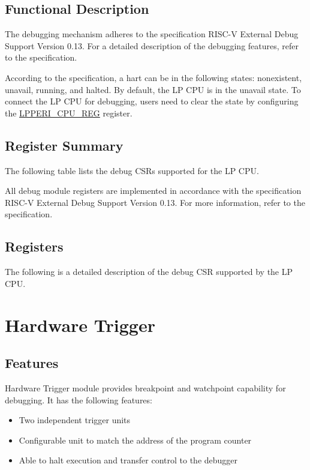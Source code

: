 \documentclass[main\_\_EN.tex]{subfiles}
\begin{document}
\subsection{Functional Description}
The debugging mechanism adheres to the specification RISC-V External Debug Support Version 0.13. For a detailed description of the debugging features, refer to the specification.

According to the specification, a hart can be in the following states: nonexistent, unavail, running, and halted. By default, the LP CPU is in the unavail state. To connect the LP CPU for debugging, users need to clear the state by configuring the \hyperref[regdesc:LPPERICPUREG]{LPPERI\_CPU\_REG} register.

\subsection{Register Summary}

The following table lists the debug CSRs supported for the LP CPU.



All debug module registers are implemented in accordance with the specification RISC-V External Debug Support Version 0.13. For more information, refer to the specification.

\subsection{Registers}
The following is a detailed description of the debug CSR supported by the LP CPU.




\section{Hardware Trigger}\label{sec:ulp-trigger}

\subsection{Features}
Hardware Trigger module provides breakpoint and watchpoint capability for debugging. It has the following features:

\begin{itemize}
    \item Two independent trigger units
    \item Configurable unit to match the address of the program counter
    \item Able to halt execution and transfer control to the debugger

\end{itemize}
\end{document}
